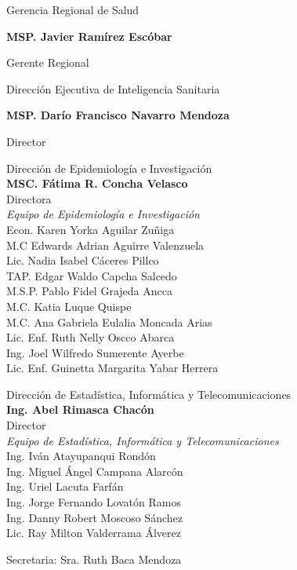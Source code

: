 \documentclass[12pt,a4paper,openany]{book}
\begin{document}
	
	\begin{center}
	
		{\large Gerencia Regional de Salud}
		
		\textbf{MSP. Javier Ramírez Escóbar}
		
		Gerente Regional \vspace{1.0cm}
		
		Dirección Ejecutiva de Inteligencia Sanitaria
		
		\textbf{MSP. Darío Francisco Navarro Mendoza}
		
		Director
		
		\vspace{1.5cm}
\noindent
\begin{minipage}[t]{.45\textwidth}
	\centering
	Dirección de Epidemiología e Investigación  \\
	\textbf{MSC. Fátima R. Concha Velasco}\\
	Directora \vspace{1.0cm}\\
	\textit{Equipo de Epidemiología e Investigación }\vspace{.5cm}\\
	Econ. Karen Yorka Aguilar Zuñiga \\
	M.C Edwards Adrian Aguirre Valenzuela \\
	Lic. Nadia Isabel Cáceres Pillco \\
	TAP. Edgar Waldo Capcha Salcedo \\
	M.S.P. Pablo Fidel Grajeda Ancca \\
	M.C. Katia Luque Quispe \\
	M.C. Ana Gabriela Eulalia Moncada Arias \\
	Lic. Enf. Ruth Nelly Oscco Abarca \\
	Ing. Joel Wilfredo Sumerente Ayerbe \\
	Lic. Enf. Guinetta Margarita Yabar Herrera \vspace{1.5cm}\\	
\end{minipage}
\hfill
\noindent
\begin{minipage}[t]{.45\textwidth}
	\centering
	Dirección de Estadística, Informática y Telecomunicaciones\\
	\textbf{Ing. Abel Rimasca Chacón} \\
	Director \vspace{1.0cm} \\
	\textit{Equipo de Estadística, Informática y Telecomunicaciones} \vspace{.5cm} \\
	Ing. Iván Atayupanqui Rondón \\
	Ing. Miguel Ángel Campana Alarcón \\
	Ing. Uriel Lacuta Farfán \\
	Ing. Jorge Fernando Lovatón Ramos \\
	Ing. Danny Robert Moscoso Sánchez \\
	Lic. Ray Milton Valderrama Álverez \vspace{1.5cm}\\
\end{minipage}
Secretaria: Sra. Ruth Baca Mendoza
	\end{center}
\end{document}
